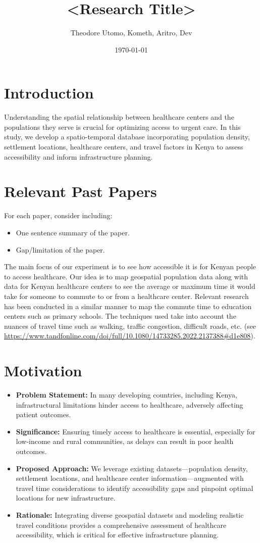 \documentclass[11pt]{article}
\title{<Research Title>}
\author{Theodore Utomo, Kometh, Aritro, Dev}
\date{\today}
\begin{document}
\maketitle

\section{Introduction}
Understanding the spatial relationship between healthcare centers and the populations they serve is crucial for optimizing access to urgent care. In this study, we develop a spatio-temporal database incorporating population density, settlement locations, healthcare centers, and travel factors in Kenya to assess accessibility and inform infrastructure planning.

\section{Relevant Past Papers}
For each paper, consider including:
\begin{itemize}
    \item One sentence summary of the paper.
    \item Gap/limitation of the paper.
\end{itemize}
The main focus of our experiment is to see how accessible it is for Kenyan people to access healthcare. Our idea is to map geospatial population data along with data for Kenyan healthcare centers to see the average or maximum time it would take for someone to commute to or from a healthcare center. Relevant research has been conducted in a similar manner to map the commute time to education centers such as primary schools. The techniques used take into account the nuances of travel time such as walking, traffic congestion, difficult roads, etc. (see \url{https://www.tandfonline.com/doi/full/10.1080/14733285.2022.2137388#d1e808}).

\section{Motivation} 
\begin{itemize} 
\item \textbf{Problem Statement:} In many developing countries, including Kenya, infrastructural limitations hinder access to healthcare, adversely affecting patient outcomes. 
\item \textbf{Significance:} Ensuring timely access to healthcare is essential, especially for low-income and rural communities, as delays can result in poor health outcomes. 
\item \textbf{Proposed Approach:} We leverage existing datasets—population density, settlement locations, and healthcare center information—augmented with travel time considerations to identify accessibility gaps and pinpoint optimal locations for new infrastructure. 
\item \textbf{Rationale:} Integrating diverse geospatial datasets and modeling realistic travel conditions provides a comprehensive assessment of healthcare accessibility, which is critical for effective infrastructure planning. \end{itemize}
\end{document}
